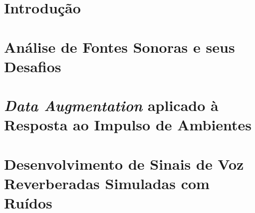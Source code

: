 \documentclass[a4paper,12pt,oneside,openany]{book}
\begin{document}
\frontmatter
\thispagestyle{empty}



\pagebreak            



\tableofcontents
\listoffigures
\listoftables

\mainmatter
\cleardoublepage
\chapter{Introdução}
\label{cap1}


\chapter{Análise de Fontes Sonoras e seus Desafios}
\label{cap2}


\chapter{\textit{Data Augmentation} aplicado à Resposta ao Impulso de Ambientes}
\label{cap3}


\chapter{Desenvolvimento de Sinais de Voz Reverberadas Simuladas com Ruídos}
\label{cap4}

\end{document}
